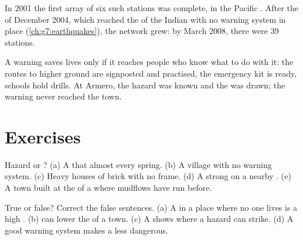 \begin{history}
In 2001 the first array of six such stations was complete, in the
Pacific . After the  of December 2004, which reached the
 of the Indian  with no warning system in place
(\cref{ch:g7:earthquakes}), the network grew: by March 2008, there were
39 stations.
\end{history}

A warning saves lives only if it reaches people who know what to do with
it: the routes to higher ground are signposted and practised, the
emergency kit is ready, schools hold drills. At Armero, the hazard was
known and the  was drawn; the warning never reached the town.

\section{Exercises}

\begin{exercise}[$\star$]\label{exo:g9:natural-risks:1}
Hazard or ? (a) A  that  almost every spring.
(b) A village with no warning system. (c) Heavy houses of brick with no
frame. (d) A strong  on a nearby . (e) A town built at the
 of a  where mudflows have run before.
\end{exercise}

\begin{exercise}[$\star$]\label{exo:g9:natural-risks:2}
True or false? Correct the false sentences. (a) A  in a
place where no one lives is a high . (b)  can lower the
 of a town. (c) A  shows where a hazard can strike.
(d) A good warning system makes a  less dangerous.
\end{exercise}

